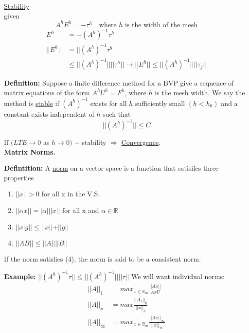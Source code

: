 \documentclass[10pt]{article}
\newcommand{\R}{\mathbb{R}}
\begin{document}
\underline{Stability}\\

given
\[A^h E^h = -\tau^h \quad \text{where }h \text{ is the width of the mesh}\]
\begin{align*}
E^h &= -(A^h)^{-1} \tau^h\\
||E^h|| &= ||(A^h)^{-1} \tau^h \\
        &\leq ||(A^h)^{-1}|| ||\tau^h|| \rightarrow ||E^h|| \leq ||(A^h)^{-1}|| ||\tau_j||
\end{align*}

\textbf{Definition:} Suppose a finite difference method for a BVP give a sequence of matrix equations of the form $A^h U^h = F^h$, where $h$ is the mesh width. We say the method is \underline{stable} if $(A^h)^{-1}$ exists for all $h$ sufficiently small $(h < h_0)$ and a constant exists independent of $h$ such that
\[||(A^h)^{-1}|| \leq C\]

If $(LTE \to 0$ as $h \to 0)$ + stability $\Rightarrow$ \underline{Convergence}.\\

\textbf{Matrix Norms.}

\textbf{Defintition:} A \underline{norm} on a vector space is a function that satisifes three properties
\begin{enumerate}
    \item $||x|| > 0$ for all x in the V.S.
    \item $||\alpha x|| = |\alpha| ||x||$ for all x and $\alpha \in \R$
    \item $||x | g || \leq ||x|| + ||g||$
    \item $||A B|| \leq ||A|| ||B||$
\end{enumerate}

If the norm satisfies (4), the norm is said to be a consistent norm.

\textbf{Example:} $||(A^h)^{-1} \tau|| \leq ||(A^h)^{-1}|| ||\tau||$
We will want individual norms:
\begin{align*}
    ||A||_1 &= max_{x \in \R_m} \frac{||Ax||}{AxU}\\
||A||_p &= max \frac{||A_x||_p}{||x||_p}\\
    ||A||_\infty &= max_{x \in \R_m} \frac{||Ax||_\infty}{||x||_\infty}\\
\end{align*}
\noindent \underline{\hspace{3in}}\\
\end{document}
